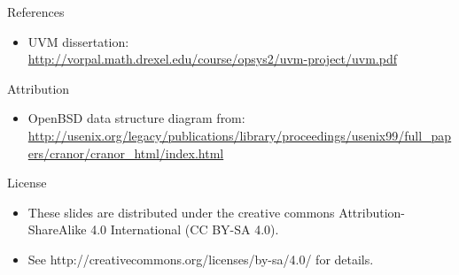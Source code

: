 \documentclass[aspectratio=169]{beamer}
\newcommand{\bi}{\begin{itemize}}
\newcommand{\ei}{\end{itemize}}
\begin{document}
\begin{frame}[noframenumbering]{References}
  \small
  \bi
\item UVM dissertation:\\
  \url{http://vorpal.math.drexel.edu/course/opsys2/uvm-project/uvm.pdf}
  \ei
\end{frame}

\begin{frame}[noframenumbering]{Attribution}
  \tiny
  \bi
\item OpenBSD data structure diagram from:\\
  \url{http://usenix.org/legacy/publications/library/proceedings/usenix99/full_papers/cranor/cranor_html/index.html}
  \ei
\end{frame}

\begin{frame}[noframenumbering]{License}
  \bi
\item These slides are distributed under the creative commons
  Attribution-ShareAlike 4.0 International (CC BY-SA 4.0).
\item See http://creativecommons.org/licenses/by-sa/4.0/ for details.
  \ei
\end{frame}
\end{document}
